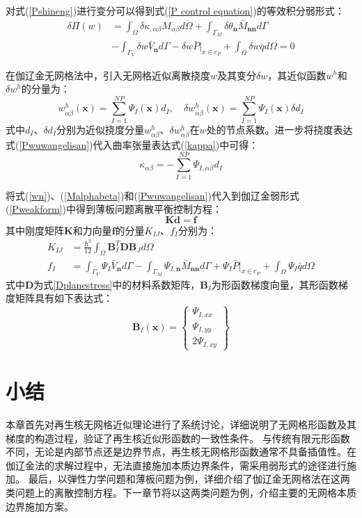 对式(\ref{Pshineng})进行变分可以得到式(\ref{P control equation})的等效积分弱形式：
\begin{equation}\label{Pweakform}
\begin{split}
        \delta\Pi(w)&=\int_{\Omega}\delta\kappa_{,\alpha\beta}M_{\alpha\beta}d\Omega+\int_{\Gamma_M}\delta\theta_{\pmb{n}}\bar{M}_{\pmb{nn}}d\Gamma\\
        &-\int_{\Gamma_V}\delta w\bar{V}_{\pmb{n}}d\Gamma-\delta w\bar{P}\vert_{x\in c_P}+\int_{\Omega}\delta w\bar{q}d\Omega=0
\end{split}
\end{equation}\par
在伽辽金无网格法中，引入无网格近似离散挠度$w$及其变分$\delta w$，其近似函数$w^h$和$\delta w^h$的分量为：
\begin{equation}
\label{Pwuwangelisan}
    w_{\alpha\beta}^h(\pmb{x})=\sum_{I=1}^{N\!P}\Psi_I(\pmb{x})d_I,\quad \delta w_{\alpha\beta}^h(\pmb{x})=\sum_{I=1}^{N\!P}\Psi_I(\pmb{x})\delta d_I
\end{equation}
式中$d_I$、$\delta d_I$分别为近似挠度分量$w_{\alpha\beta}^h$、$\delta w_{\alpha\beta}^h$在$w$处的节点系数。进一步将挠度表达式(\ref{Pwuwangelisan})代入曲率张量表达式(\ref{kappa})中可得：
\begin{equation}
\kappa_{\alpha\beta}=-\sum_{I=1}^{N\!P}\Psi_{I,\alpha\beta}d_I
\end{equation}\par
将式(\ref{wn})、(\ref{Malphabeta})和(\ref{Pwuwangelisan})代入到伽辽金弱形式(\ref{Pweakform})中得到薄板问题离散平衡控制方程：
\begin{equation}
     \pmb{K}\pmb{d}=\pmb{f}
\end{equation}
其中刚度矩阵$\boldsymbol K$和力向量$\pmb f$的分量$K_{IJ}$、$f_I$分别为：
\begin{subequations}\label{PKf}
\begin{align}
    \label{PKf1}K_{IJ}&=\frac{h^3}{12}\int_{\Omega}\pmb{B}^T_I\pmb{D}\pmb{B}_Jd\Omega\\
    \label{PKf2}f_I&=\int_{\Gamma_V}\Psi_I\bar{V}_{\pmb{n}}d\Gamma-\int_{\Gamma_M}\Psi_{I,\pmb{n}}\bar{M}_{\pmb{nn}}d\Gamma+\Psi_I\bar{P}\vert_{x\in c_P}+\int_{\Omega}\Psi_I\bar{q}d\Omega
\end{align}
\end{subequations}
式中$\pmb{D}$为式\ref{Dplanestress}中的材料系数矩阵，$\pmb{B}_I$为形函数梯度向量，其形函数梯度矩阵具有如下表达式：
\begin{equation}
\pmb{B}_I(\pmb{x})= \begin{Bmatrix}\Psi_{I,xx}\\\Psi_{I,yy}\\2\Psi_{I,xy}\end{Bmatrix} 
\end{equation}
\section{小结}
本章首先对再生核无网格近似理论进行了系统讨论，详细说明了无网格形函数及其梯度的构造过程，验证了再生核近似形函数的一致性条件。
与传统有限元形函数不同，无论是内部节点还是边界节点，再生核无网格形函数通常不具备插值性。在伽辽金法的求解过程中，无法直接施加本质边界条件，需采用弱形式的途径进行施加。
最后，以弹性力学问题和薄板问题为例，详细介绍了伽辽金无网格法在这两类问题上的离散控制方程。下一章节将以这两类问题为例，介绍主要的无网格本质边界施加方案。
